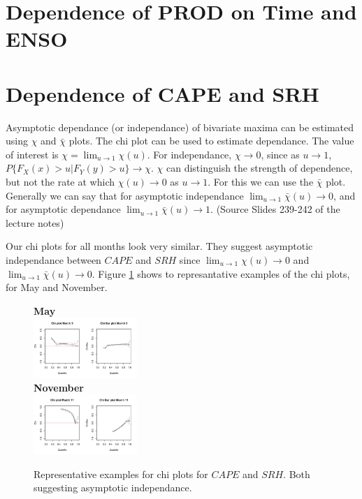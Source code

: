 \documentclass[10pt,conference,compsocconf]{IEEEtran}
\begin{document}
\section*{Dependence of PROD on Time and ENSO}


\section*{Dependence of CAPE and SRH}
Asymptotic dependance (or independance) of bivariate maxima can be estimated using $\chi$ and $\bar{\chi}$ plots. The chi plot can be used to estimate dependance. The value of interest is $\chi = \lim_{u \to 1} \chi(u)$. For independance, $\chi \to 0$, since as $u \to 1$, $P\{F_X(x)>u | F_Y(y)>u\} \to \chi$. $\chi$ can distinguish the strength of dependence, but not the rate at which $\chi(u) \to 0$ as $u \to 1$. For this we can use the $\bar{\chi}$ plot. Generally we can say that for asymptotic independance $\lim_{u \to 1} \bar{\chi}(u) \to 0$, and for asymptotic dependance $\lim_{u \to 1} \bar{\chi}(u) \to 1$. (Source Slides 239-242 of the lecture notes)
\par
Our chi plots for all months look very similar. They suggest asymptotic independance between $CAPE$ and $SRH$ since $\lim_{u \to 1} \chi(u) \to 0$ and $\lim_{u \to 1} \bar{\chi}(u) \to 0$. Figure \ref{fig:cape_srh_chi} shows to represantative examples of the chi plots, for May and November. 

\begin{figure}
	\centering
	\textbf{May}\\
	\includegraphics[width=0.35\textwidth]{../plots/May_chi.pdf}\\
	\textbf{November}\\
	\includegraphics[width=0.35\textwidth]{../plots/November_chi.pdf}
	\caption{Representative examples for chi plots for $CAPE$ and $SRH$. Both suggesting asymptotic independance.}
	\label{fig:cape_srh_chi}
\end{figure}
\end{document}
